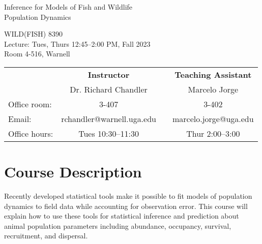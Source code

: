 \documentclass[12pt]{article}
\begin{document}

{\centering

{\Large \sc
  Inference for Models of Fish and Wildlife \\ Population Dynamics  
}
\vspace{6pt}

WILD(FISH) 8390  \\
Lecture: Tues, Thurs 12:45--2:00 PM, Fall 2023 \\
Room 4-516, Warnell \\


\normalsize

\vspace{12pt}

\begin{tabular}[h!]{lccc}
                     & \textbf{Instructor}       & \hspace{0.01cm} & \textbf{Teaching Assistant} \\
                     & Dr. Richard Chandler      &                 & Marcelo Jorge                \\
Office room:         & 3-407                     &                 & 3-402                       \\
Email:               & rchandler@warnell.uga.edu &                 & marcelo.jorge@uga.edu       \\
Office hours:        & Tues 10:30--11:30         &                 & Thur 2:00--3:00             \\
\end{tabular}


}



\normalsize


\vspace{-2mm}
\section*{\normalsize Course Description}
\vspace{-4mm}
Recently developed statistical tools make it possible to fit models of
population dynamics to field data while accounting for observation
error. This course will explain how to use these tools for statistical
inference and prediction about animal population parameters including
abundance, occupancy, survival, recruitment, and dispersal.   
\end{document}
